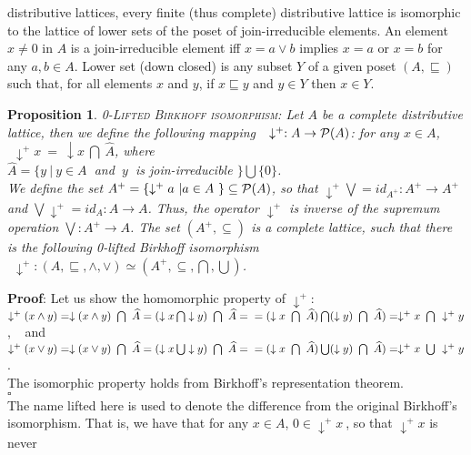 \documentclass[10pt,twocolumn]{article}
\newtheorem{propo}{Proposition}
\begin{document}
distributive lattices, every finite (thus complete) distributive
lattice is isomorphic to the lattice of lower sets of the poset of
join-irreducible elements. An element $x \neq 0$ in $A$ is a
join-irreducible element iff $x = a \vee b$ implies $x = a$ or $x =
b$ for any $a,b \in A$. Lower set (down closed) is any subset $Y$ of
a given poset $(A,\sqsubseteq)$ such that, for all elements $x$ and
$y$, if $x \sqsubseteq y$ and $y \in Y$ then $x\in Y$.
\begin{propo} \cite{Birkh40} \textsc{0-Lifted Birkhoff isomorphism:}  \label{def:canisomor}
Let $A$ be a complete distributive lattice, then we define the
following mapping $~~\downarrow^+:A \rightarrow \P(A)$: for any $x
\in A$, $~~\downarrow^+ x ~ = ~ \downarrow x ~\bigcap~\widehat{A}$,
where \\$\widehat{A} = \{y~|~y \in A~$ and $~y~$ is
join-irreducible $\} \bigcup \{0 \}$. \\
 We define the set $A^+ = \{\downarrow^+ a ~| a \in A~\} \subseteq
\P(A)$,  so that $\downarrow^+ \bigvee = id_{A^+}:A^+ \rightarrow
A^+$  and $\bigvee \downarrow^+ = id_A:A \rightarrow A$.  Thus, the
operator $\downarrow^+$ is inverse of the supremum operation
$\bigvee:A^+ \rightarrow A$. The set $(A^+, \subseteq)$ is a
complete lattice, such that there is the following 0-lifted Birkhoff
isomorphism $~~\downarrow^+:(A, \sqsubseteq, \wedge, \vee) \simeq
(A^+,\subseteq, \bigcap, \bigcup)$.
\end{propo}
\textbf{Proof}: Let us show the homomorphic property of
$\downarrow^+$:\\
$\downarrow^+ (x\wedge y) = \downarrow(x\wedge
y)~\bigcap~\widehat{A} = (\downarrow x \bigcap \downarrow
y)~\bigcap~\widehat{A} =\\= (\downarrow x ~\bigcap~\widehat{A})
\bigcap (\downarrow y)~\bigcap~\widehat{A}) =  \downarrow^+ x
~\bigcap~\downarrow^+ y$, $~~$ and \\
$\downarrow^+ (x\vee y) = \downarrow(x\vee y)~\bigcap~\widehat{A} =
(\downarrow x \bigcup \downarrow y)~\bigcap~\widehat{A} = \\ =
(\downarrow x ~\bigcap~\widehat{A}) \bigcup (\downarrow
y)~\bigcap~\widehat{A}) =  \downarrow^+ x ~\bigcup~\downarrow^+
y$. \\
The isomorphic property holds from Birkhoff's representation
theorem.
\\ $\square$ \\
The name lifted here is used to denote the difference from the
original Birkhoff's isomorphism. That is, we have that for any $x
\in A$, $0 \in \downarrow^+ x ~$, so that $\downarrow^+ x$ is never
\end{document}
